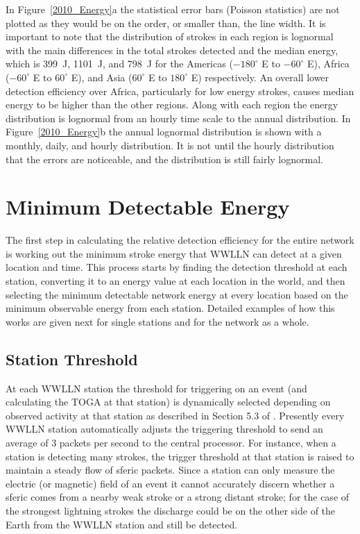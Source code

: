 \documentclass[draft,ras]{agutex}
\begin{document}
\begin{article}
In Figure~\ref{2010_Energy}a the statistical error bars (Poisson statistics) are not plotted as they would be on the order, or smaller than, the line width. It is important to note that the distribution of strokes in each region is lognormal \citep{Hutchins2012} with the main differences in the total strokes detected and the median energy, which is 399~J, 1101~J, and 798~J for the Americas ($-180^\circ$ E to $-60^\circ$ E), Africa ($-60^\circ$ E to $60^\circ$ E), and Asia ($60^\circ$ E to $180^\circ$ E) respectively. An overall lower detection efficiency over Africa, particularly for low energy strokes, causes median energy to be higher than the other regions. Along with each region the energy distribution is lognormal from an hourly time scale to the annual distribution. In Figure~\ref{2010_Energy}b the annual lognormal distribution is shown with a monthly, daily, and hourly distribution. It is not until the hourly distribution that the errors are noticeable, and the distribution is still fairly lognormal.

\section{Minimum Detectable Energy}

The first step in calculating the relative detection efficiency for the entire network is working out the minimum stroke energy that WWLLN can detect at a given location and time. This process starts by finding the detection threshold at each station, converting it to an energy value at each location in the world, and then selecting the minimum detectable network energy at every location based on the minimum observable energy from each station. Detailed examples of how this works are given next for single stations and for the network as a whole.

\subsection{Station Threshold}

At each WWLLN station the threshold for triggering on an event (and calculating the TOGA at that station) is dynamically selected depending on observed activity at that station as described in Section 5.3 of \citet{Rodger2006}. Presently every WWLLN station automatically adjusts the triggering threshold to send an average of 3 packets per second to the central processor. For instance, when a station is detecting many strokes, the trigger threshold at that station is raised to maintain a steady flow of sferic packets. Since a station can only measure the electric (or magnetic) field of an event it cannot accurately discern whether a sferic comes from a nearby weak stroke or a strong distant stroke; for the case of the strongest lightning strokes the discharge could be on the other side of the Earth from the WWLLN station and still be detected. 


\end{article}
\end{document}
